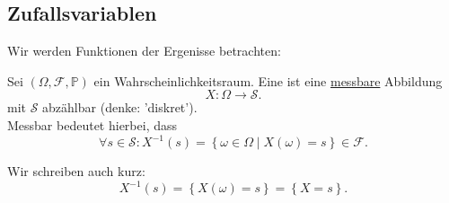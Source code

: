 \subsection{Zufallsvariablen}
Wir werden Funktionen der Ergenisse betrachten:
\begin{definition}\label{def:diskrete-zufallsvariable}
    Sei $(\Omega, \mathcal{F}, \mathbb{P})$ ein Wahrscheinlichkeitsraum. Eine  ist eine \underline{messbare} Abbildung
    \[
    X : \Omega \longrightarrow \mathcal{S}
    .\] 
    mit $\mathcal{S}$ abzählbar (denke: 'diskret'). \\
    Messbar bedeutet hierbei, dass
    \[
        \forall s\in \mathcal{S} \colon X^{-1}(s) = \left \{\omega\in \Omega\mid  X(\omega) = s\right\} \in  \mathcal{F}
    .\] 
\end{definition}
\begin{notation}
    Wir schreiben auch kurz:
    \[
        X^{-1}(s) = \left \{X(\omega) = s\right\}  = \left \{X = s\right\} 
    .\] 
\end{notation}

